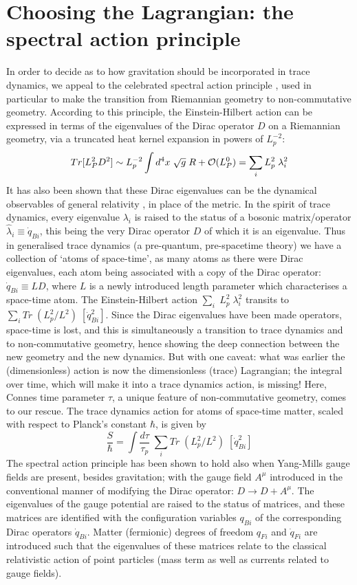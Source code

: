 \documentclass[a4paper]{jpconf}
\begin{document}
 \section{Choosing the Lagrangian: the spectral action principle}
 In order to decide as to how gravitation should be incorporated in trace dynamics, we appeal to the celebrated spectral action principle \cite{Chams}, used in particular to make the transition from Riemannian geometry to non-commutative geometry.  According to this principle, the Einstein-Hilbert action can be expressed in terms of the eigenvalues of the Dirac operator $D$ on a Riemannian geometry, via a truncated heat kernel expansion in powers of $L_p^{-2}$:
 \begin{equation}
 Tr [L_P^2 D^2] \sim L_p^{-2}\int d^4x\; \sqrt{g}\; R + {\cal O}(L_P^{0}) =\sum_{i}L_p^2\; \lambda_i^2 \end{equation}
It has also been shown that these Dirac eigenvalues can be the dynamical observables of general relativity \cite{Landi}, in place of the metric. In the spirit of trace dynamics, every eigenvalue $\lambda_i$ is raised to the status of a bosonic matrix/operator $\hat{\lambda}_i\equiv \dot{q}_{Bi}$, this being the very Dirac operator $D$ of which it is an eigenvalue. Thus in generalised trace dynamics (a pre-quantum, pre-spacetime theory) we have a collection of `atoms of space-time', as many atoms as there were Dirac eigenvalues, each atom being associated with a copy of the Dirac operator: $\dot{q}_{Bi}\equiv LD$, where $L$ is a newly introduced length parameter which characterises a space-time atom. The Einstein-Hilbert action $\sum_i\; L_p^2\;  \lambda_i^2$ transits to $\sum_i Tr \; (L_p^2/L^2)\; [\dot{q}_{Bi}^2]$. Since the Dirac eigenvalues have been made operators, space-time is lost, and this is simultaneously a transition to trace dynamics and to non-commutative geometry, hence showing the deep connection between the new geometry and the new dynamics. But with one caveat: what was earlier the (dimensionless) action is now the dimensionless (trace) Lagrangian; the integral over time, which will make it into a trace dynamics action, is missing! Here, Connes time parameter $\tau$, a unique feature of non-commutative geometry, comes to our rescue. The trace dynamics action for atoms of space-time matter, scaled with respect to Planck's constant $\hbar$, is given by
\begin{equation} 
\frac{S}{\hbar} = \int \frac{d\tau}{\tau_p} \; \sum_i Tr \; (L_p^2/L^2)\; [\dot{q}_{Bi}^2]
\end{equation}
The spectral action principle has been shown to hold also when Yang-Mills gauge fields are present, besides gravitation; with the gauge field $A^\mu$ introduced in the conventional manner of modifying the Dirac operator: $D\rightarrow D + A^\mu$. The eigenvalues of the gauge potential are raised to the status of matrices, and these matrices are identified with the configuration variables $q_{Bi}$ of the corresponding Dirac operators  $\dot{q}_{Bi}$. Matter (fermionic) degrees of freedom $q_{Fi}$ and $\dot{q}_{Fi}$ are introduced such that the eigenvalues of these matrices relate to the classical relativistic action of point particles (mass term as well as currents related to gauge fields). 
\end{document}
